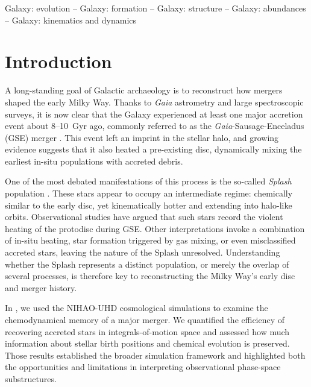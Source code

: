 \documentclass[fleqn,usenatbib]{mnras}
\begin{document}
\begin{abstract}
\end{abstract}

\begin{keywords}
Galaxy: evolution -- Galaxy: formation -- Galaxy: structure -- Galaxy: abundances -- Galaxy: kinematics and dynamics
\end{keywords}


\section{Introduction}
\label{sec:introduction}

A long-standing goal of Galactic archaeology is to reconstruct how mergers shaped the early Milky Way. 
Thanks to \textit{Gaia} astrometry \citep{Brown2021b} and large spectroscopic surveys, it is now clear that the Galaxy experienced at least one major accretion event about 8--10~Gyr ago, commonly referred to as the \textit{Gaia}-Sausage-Enceladus (GSE) merger \citep{Belokurov2018, Helmi2018, Naidu2020}. 
This event left an imprint in the stellar halo, and growing evidence suggests that it also heated a pre-existing disc, dynamically mixing the earliest in-situ populations with accreted debris.

One of the most debated manifestations of this process is the so-called \textit{Splash} population \citep{Belokurov2020, Belokurov2022}. These stars appear to occupy an intermediate regime: chemically similar to the early disc, yet kinematically hotter and extending into halo-like orbits. Observational studies have argued that such stars record the violent heating of the protodisc during GSE. Other interpretations invoke a combination of in-situ heating, star formation triggered by gas mixing, or even misclassified accreted stars, leaving the nature of the Splash unresolved. Understanding whether the Splash represents a distinct population, or merely the overlap of several processes, is therefore key to reconstructing the Milky Way’s early disc and merger history.

In \citet[][hereafter ]{Buder2025c}, we used the NIHAO-UHD cosmological simulations \citep{Buck2020, Buck2021} to examine the chemodynamical memory of a major merger. We quantified the efficiency of recovering accreted stars in integrals-of-motion space and assessed how much information about stellar birth positions and chemical evolution is preserved. Those results established the broader simulation framework and highlighted both the opportunities and limitations in interpreting observational phase-space substructures.
\end{document}
